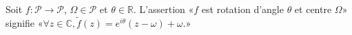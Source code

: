 Soit $f:\mathcal P\to \mathcal P$, $\Omega\in\mathcal P$ et $\theta\in\mathbb R$. L'assertion «$f$ est rotation d'angle $\theta$ et centre $\Omega$» signifie «$\forall z\in\mathbb C, \tilde f(z)=e^{i\theta}(z-\omega)+\omega$.»

\begin{reponses}
\end{reponses}

